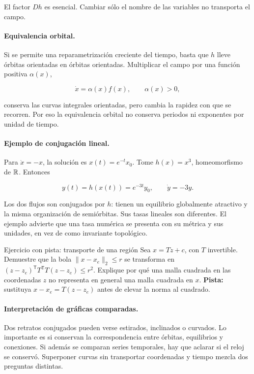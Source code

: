 El factor $Dh$ es esencial. Cambiar sólo el nombre de las variables no transporta el
campo.

\paragraph{Equivalencia orbital.}
Si se permite una reparametrización creciente del tiempo, basta que $h$ lleve órbitas
orientadas en órbitas orientadas. Multiplicar el campo por una función positiva
$\alpha(x)$,

\begin{equation}
 \dot x=\alpha(x)f(x),\qquad \alpha(x)>0,
 \label{eq:gt-reparametrizacion}
\end{equation}

conserva las curvas integrales orientadas, pero cambia la rapidez con que se recorren.
Por eso la equivalencia orbital no conserva periodos ni exponentes por unidad de
tiempo.

\paragraph{Ejemplo de conjugación lineal.}
Para $\dot x=-x$, la solución es $x(t)=e^{-t}x_0$. Tome
$h(x)=x^3$, homeomorfismo de $\mathbb{R}$. Entonces

\begin{equation}
 y(t)=h(x(t))=e^{-3t}y_0,\qquad \dot y=-3y.
 \label{eq:gt-conjugacion-cubica}
\end{equation}

Los dos flujos son conjugados por $h$: tienen un equilibrio globalmente atractivo y la
misma organización de semiórbitas. Sus tasas lineales son diferentes. El ejemplo
advierte que una tasa numérica se presenta con su métrica y sus unidades, en vez de como invariante topológico.

\begin{activitybox}{Ejercicio con pista: transporte de una región}
Sea $x=Tz+c$, con $T$ invertible. Demuestre que la bola
$\|x-x_e\|_2\leq r$ se transforma en
$(z-z_e)^{\mathsf T}T^{\mathsf T}T(z-z_e)\leq r^2$.
Explique por qué una malla cuadrada en las coordenadas $z$ no representa en general
una malla cuadrada en $x$. \textbf{Pista:} sustituya
$x-x_e=T(z-z_e)$ antes de elevar la norma al cuadrado.
\end{activitybox}

\paragraph{Interpretación de gráficas comparadas.}
Dos retratos conjugados pueden verse estirados, inclinados o curvados. Lo importante
es si conservan la correspondencia entre órbitas, equilibrios y conexiones. Si además
se comparan series temporales, hay que aclarar si el reloj se conservó. Superponer
curvas sin transportar coordenadas y tiempo mezcla dos preguntas distintas.

